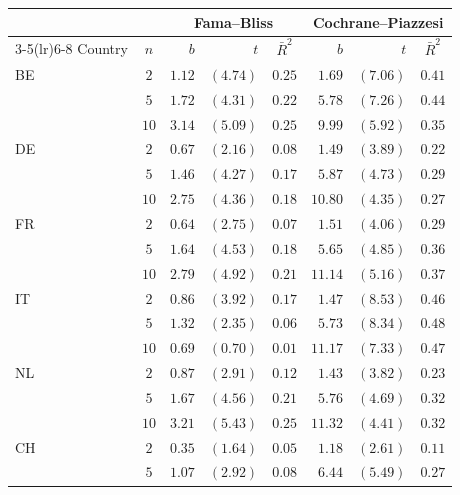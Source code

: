 \small
\begin{tabular}{l c rrc rrc}
  \toprule
  & & \multicolumn{3}{c}{Fama--Bliss} & \multicolumn{3}{c}{Cochrane--Piazzesi} \\
  \cmidrule(lr){3-5}\cmidrule(lr){6-8}
  Country & $n$ & $b$ & $t$ & $\bar{R}^{2}$ & $b$ & $t$ & $\bar{R}^{2}$ \\
  \midrule
  BE & $2$  & $1.12$ & $(4.74)$ & $0.25$ & $1.69$  & $(7.06)$  & $0.41$ \\
     & $5$  & $1.72$ & $(4.31)$ & $0.22$ & $5.78$  & $(7.26)$  & $0.44$ \\
     & $10$ & $3.14$ & $(5.09)$ & $0.25$ & $9.99$  & $(5.92)$  & $0.35$ \\
  \addlinespace
  DE & $2$  & $0.67$ & $(2.16)$ & $0.08$ & $1.49$  & $(3.89)$  & $0.22$ \\
     & $5$  & $1.46$ & $(4.27)$ & $0.17$ & $5.87$  & $(4.73)$  & $0.29$ \\
     & $10$ & $2.75$ & $(4.36)$ & $0.18$ & $10.80$ & $(4.35)$  & $0.27$ \\
  \addlinespace
  FR & $2$  & $0.64$ & $(2.75)$ & $0.07$ & $1.51$  & $(4.06)$  & $0.29$ \\
     & $5$  & $1.64$ & $(4.53)$ & $0.18$ & $5.65$  & $(4.85)$  & $0.36$ \\
     & $10$ & $2.79$ & $(4.92)$ & $0.21$ & $11.14$ & $(5.16)$  & $0.37$ \\
  \addlinespace
  IT & $2$  & $0.86$ & $(3.92)$ & $0.17$ & $1.47$  & $(8.53)$  & $0.46$ \\
     & $5$  & $1.32$ & $(2.35)$ & $0.06$ & $5.73$  & $(8.34)$  & $0.48$ \\
     & $10$ & $0.69$ & $(0.70)$ & $0.01$ & $11.17$ & $(7.33)$  & $0.47$ \\
  \addlinespace
  NL & $2$  & $0.87$ & $(2.91)$ & $0.12$ & $1.43$  & $(3.82)$  & $0.23$ \\
     & $5$  & $1.67$ & $(4.56)$ & $0.21$ & $5.76$  & $(4.69)$  & $0.32$ \\
     & $10$ & $3.21$ & $(5.43)$ & $0.25$ & $11.32$ & $(4.41)$  & $0.32$ \\
  \addlinespace
  CH & $2$  & $0.35$ & $(1.64)$ & $0.05$ & $1.18$  & $(2.61)$  & $0.11$ \\
     & $5$  & $1.07$ & $(2.92)$ & $0.08$ & $6.44$  & $(5.49)$  & $0.27$ \\

\end{tabular}
